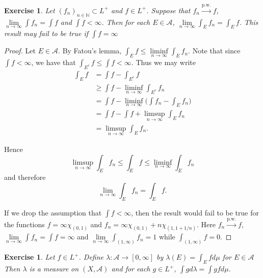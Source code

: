 \documentclass[12pt]{amsart}
\newtheorem{ex}[thm]{Exercise}
\newcommand{\lam}{\lambda}
\newcommand{\N}{\mathbb{N}}
\newcommand{\MA}{\mathcal{A}}
\newcommand{\RG}{[0,\infty]}
\newcommand{\limfn}{\liminf \limits_{n \rightarrow \infty}}
\newcommand{\limpn}{\limsup \limits_{n \rightarrow \infty}}
\newcommand{\limn}{\lim \limits_{n \rightarrow \infty}}
\begin{document}
\begin{ex}

Let $(f_n)_{n \in \N} \subset L^+$ and $f \in L^+$. Suppose that $f_n \xrightarrow{\text{p.w.}} f$, $\lim \limits_{n \rightarrow \infty} \int f_n = \int f$ and $\int f < \infty$. Then for each $E \in \MA$, $\lim \limits_{n \rightarrow \infty} \int_E f_n = \int_E f$. This result may fail to be true if $\int f = \infty$

\end{ex}

\begin{proof}

Let $E \in \MA$. By Fatou's lemma, $\int_E f \leq \limfn \int_E f_n$. Note that since $\int f < \infty$, we have that $\int_{E^c} f \leq \int f < \infty$. Thus we may write
\begin{align*}
\int_E f 
&= \int f - \int_{E^c} f\\
&\geq \int f - \limfn \int_{E^c} f_n\\
&= \int f - \limfn \bigg(\int f_n - \int_{E} f_n\bigg)\\
&= \int f - \int f  + \limpn \int_{E} f_n\\
&= \limpn \int_E f_n.
\end{align*}

Hence $$\limpn \int_E f_n \leq \int_E f \leq \limfn \int_E f_n$$ and therefore $$\limn \int_E f_n = \int_E f.$$ 

If we drop the assumption that $\int f < \infty$, then the result would fail to be true for the functions $f = \infty \chi_{(0,1)}$ and $ f_n = \infty \chi_{(0,1)} + n \chi_{(1,1+1/n)}$. Here $f_n \xrightarrow{\text{p.w.}} f$, $\limn \int f_n = \int f = \infty$ and $\limn \int_{(1,\infty)} f_n = 1$ while $\int_{(1,\infty)} f = 0$.  

\end{proof}

\begin{ex}
Let $f \in L^+$. Define $\lam: \MA \rightarrow \RG$ by $\lam(E) = \int_E f d\mu$ for $E \in \MA$
Then $\lam$ is a measure on $(X, \MA)$ and for each $g \in L^+$, $\int g d\lam = \int g f d\mu$.
\end{ex}
\end{document}
